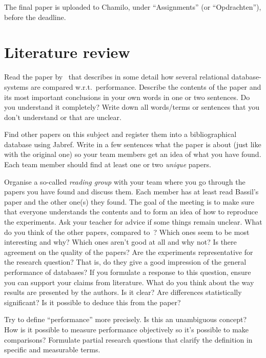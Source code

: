\documentclass[fleqn,10pt]{artikeltin}
\begin{document}
The final paper is uploaded to Chamilo, under ``Assignments'' (or ``Opdrachten''), before the deadline.


\section{Literature review}
\label{sec:literature-review}

Read the paper by~\textcite{Bassil2012} that describes in some detail how several relational database-systems are compared w.r.t.~performance. Describe the contents of the paper and its most important conclusions in your own words in one or two sentences. Do you understand it completely? Write down all words/terms or sentences that you don't understand or that are unclear.

Find other papers on this subject and register them into a bibliographical database using Jabref. Write in a few sentences what the paper is about (just like with the original one) so your team members get an idea of what you have found. Each team member should find at least one or two \emph{unique} papers.

Organise a so-called \emph{reading group} with your team where you go through the papers you have found and discuss them. Each member has at least read Bassil's paper and the other one(s) they found. The goal of the meeting is to make sure that everyone understands the contents and to form an idea of how to reproduce the experiments. Ask your teacher for advice if some things remain unclear. What do you think of the other papers, compared to~\textcite{Bassil2012}? Which ones seem to be most interesting and why? Which ones aren't good at all and why not? Is there agreement on the quality of the papers? Are the experiments representative for the research question? That is, do they give a good impression of the general performance of databases? If you formulate a response to this question, ensure you can support your claims from literature. What do you think about the way results are presented by the authors. Is it clear? Are differences statistically significant? Is it possible to deduce this from the paper?

Try to define ``performance'' more precisely. Is this an unambiguous concept? How is it possible to measure performance objectively so it's possible to make comparisons? Formulate partial research questions that clarify the definition in specific and measurable terms.
\end{document}
